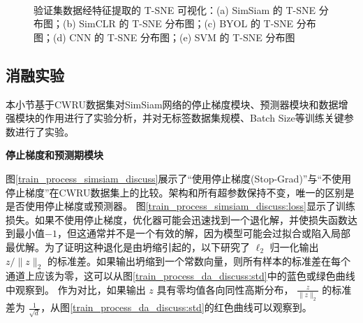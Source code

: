 \documentclass[master]{thesis-uestc}
\begin{document}
\begin{figure}[h]
    \centering
    \\
    \caption{验证集数据经特征提取的 T-SNE 可视化：(a) SimSiam 的 T-SNE 分布图；(b) SimCLR 的 T-SNE 分布图；(c) BYOL 的 T-SNE 分布图；(d) CNN 的 T-SNE 分布图；(e) SVM 的 T-SNE 分布图}
    \label{tsne_of_all_models}
\end{figure}
\FloatBarrier  %
\subsection{消融实验}
本小节基于CWRU数据集对SimSiam网络的停止梯度模块、预测器模块和数据增强模块的作用进行了实验分析，并对无标签数据集规模、Batch Size等训练关键参数进行了实验。

\textbf{停止梯度和预测期模块}

图\ref{train_process_simsiam_discuss}展示了“使用停止梯度(Stop-Grad)”与“不使用停止梯度”在CWRU数据集上的比较。架构和所有超参数保持不变，唯一的区别是是否使用停止梯度或预测器。
图\ref{train_process_simsiam_discuss:loss}显示了训练损失。如果不使用停止梯度，优化器可能会迅速找到一个退化解，并使损失函数达到最小值\(-1\)，但这通常并不是一个有效的解，因为模型可能会过拟合或陷入局部最优解。为了证明这种退化是由坍缩引起的，以下研究了 \(\ell_2\) 归一化输出 \( z / \|z\|_2 \) 的标准差。如果输出坍缩到一个常数向量，则所有样本的标准差在每个通道上应该为零，这可以从图\ref{train_process_da_discuss:std}中的蓝色或绿色曲线中观察到。
作为对比，如果输出 \( z \) 具有零均值各向同性高斯分布， \( \frac{z}{\|z\|_2} \) 的标准差为 \( \frac{1}{\sqrt{d}} \)，从图\ref{train_process_da_discuss:std}的红色曲线可以观察到。
\end{document}
